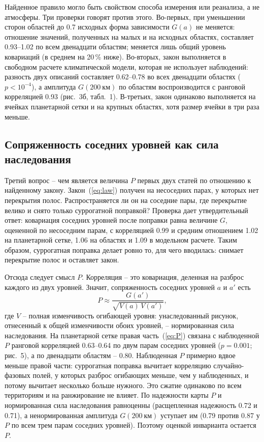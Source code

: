 \documentclass[12pt,a4paper]{article}
\begin{document}
Найденное правило могло быть свойством способа измерения или реанализа, а не атмосферы. Три проверки говорят против этого. Во-первых, при уменьшении сторон областей до 0.7 исходных форма зависимости $G(a)$ не меняется: отношение значений, полученных на малых и на исходных областях, составляет 0.93--1.02 по всем двенадцати областям; меняется лишь общий уровень ковариаций (в среднем на 20\,\% ниже). Во-вторых, закон выполняется в свободном расчете климатической модели, которая не использует наблюдений: разность двух описаний составляет 0.62--0.78 во всех двенадцати областях ($p < 10^{-4}$), а амплитуда $G(200~\text{км})$ по областям воспроизводится с ранговой корреляцией 0.93 (рис.~3б, табл.~1). В-третьих, закон одинаково выполняется на ячейках планетарной сетки и на крупных областях, хотя размер ячейки в три раза меньше.

\subsection{Сопряженность соседних уровней как сила наследования}

Третий вопрос -- чем является величина $P$ первых двух статей по отношению к найденному закону. Закон~(\ref{eq:law}) получен на несоседних парах, у которых нет перекрытия полос. Распространяется ли он на соседние пары, где перекрытие велико и снято только суррогатной поправкой? Проверка дает утвердительный ответ: ковариация соседних уровней после поправки равна величине $G$, оцененной по несоседним парам, с корреляцией 0.99 и средним отношением 1.02 на планетарной сетке, 1.06 на областях и 1.09 в модельном расчете. Таким образом, суррогатная поправка делает ровно то, для чего вводилась: снимает перекрытие полос и оставляет закон.

Отсюда следует смысл $P$. Корреляция -- это ковариация, деленная на разброс каждого из двух уровней. Значит, сопряженность соседних уровней $a$ и $a'$ есть
\begin{equation}
P \approx \frac{G(a')}{\sqrt{V(a)\,V(a')}},
\label{eq:P}
\end{equation}
где $V$ -- полная изменчивость огибающей уровня: унаследованный рисунок, отнесенный к общей изменчивости обоих уровней, -- нормированная сила наследования. На планетарной сетке правая часть~(\ref{eq:P}) связана с наблюденной $P$ ранговой корреляцией 0.63--0.64 по двум парам соседних уровней ($p = 0.001$; рис.~5), а по двенадцати областям -- 0.80. Наблюденная $P$ примерно вдвое меньше правой части: суррогатная поправка вычитает корреляцию случайно-фазовых полей, у которых разброс огибающих меньше, чем у наблюденных, и потому вычитает несколько больше нужного. Это сжатие одинаково по всем территориям и на ранжирование не влияет. По надежности карты $P$ и нормированная сила наследования равноценны (расщепленная надежность 0.72 и 0.71), а ненормированная амплитуда $G(200~\text{км})$ уступает им (0.79 против 0.87 у $P$ по всем трем парам соседних уровней). Поэтому оценкой инварианта остается $P$.
\end{document}
